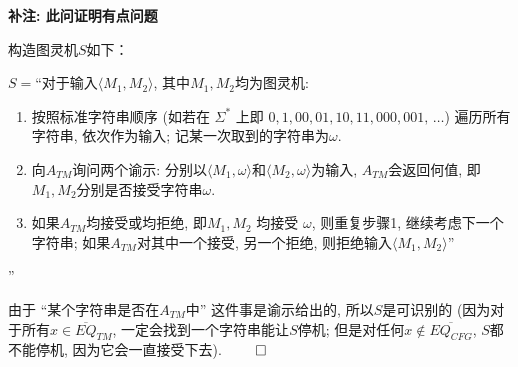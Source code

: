 \documentclass[UTF8]{report}
\renewenvironment{proof}{{\setlength{\parskip}{7pt}\noindent\hskip 2em \bf 证明 \quad}}{\hfill$\qed$\par}
\begin{document}
\begin{proof}
    \textbf{补注: 此问证明有点问题}

    构造图灵机$S$如下：
    
    $S=$``对于输入$\langle M_1, M_2 \rangle$, 其中$M_1, M_2$均为图灵机:
    \begin{enumerate}
        \item 按照标准字符串顺序 (如若在 $\Sigma^*$ 上即 $0, 1, 00, 01, 10, 11, 000, 001,\,\dots$) 遍历所有字符串, 依次作为输入; 记某一次取到的字符串为$\omega$.
        \item 向$A_{TM}$询问两个谕示: 分别以$\langle M_1, \omega \rangle$和$\langle M_2, \omega \rangle$为输入, $A_{TM}$会返回何值, 即$M_1, M_2$分别是否接受字符串$\omega$.
        \item 如果$A_{TM}$均接受或均拒绝, 即$M_1, M_2$ 均接受 $\omega$, 则重复步骤1, 继续考虑下一个字符串; 如果$A_{TM}$对其中一个接受, 另一个拒绝, 则拒绝输入$\langle M_1, M_2 \rangle$''
    \end{enumerate}
    ''

    由于 ``某个字符串是否在$A_{TM}$中'' 这件事是谕示给出的, 所以$S$是可识别的 (因为对于所有$x \in \overline{EQ}_{TM}$, 一定会找到一个字符串能让$S$停机; 但是对任何$x \notin \overline{EQ_{CFG}}$, $S$都不能停机, 因为它会一直接受下去).
\end{proof}
\end{document}
